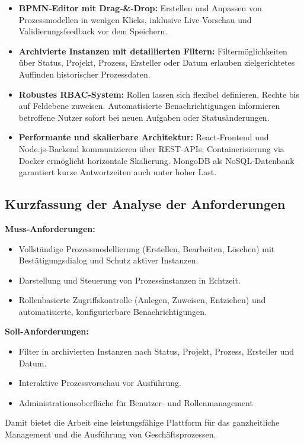 \begin{itemize}
  \item \textbf{BPMN‑Editor mit Drag‑\&‑Drop:} Erstellen und Anpassen von Prozessmodellen in wenigen Klicks, inklusive Live‑Vorschau und Validierungsfeedback vor dem Speichern.
  \item \textbf{Archivierte Instanzen mit detaillierten Filtern:} Filtermöglichkeiten über Status, Projekt, Prozess, Ersteller oder Datum erlauben zielgerichtetes Auffinden historischer Prozessdaten.
  \item \textbf{Robustes RBAC‑System:} Rollen lassen sich flexibel definieren, Rechte bis auf Feldebene zuweisen. Automatisierte Benachrichtigungen informieren betroffene Nutzer sofort bei neuen Aufgaben oder Statusänderungen.
  \item \textbf{Performante und skalierbare Architektur:} React‑Frontend und Node.js‑Backend kommunizieren über REST‑APIs; Containerisierung via Docker ermöglicht horizontale Skalierung. MongoDB als NoSQL‑Datenbank garantiert kurze Antwortzeiten auch unter hoher Last.
\end{itemize}

\newpage
\subsection*{Kurzfassung der Analyse der Anforderungen}
\textbf{Muss‑Anforderungen:}
\begin{itemize}
  \item Vollständige Prozessmodellierung (Erstellen, Bearbeiten, Löschen) mit Bestätigungsdialog und Schutz aktiver Instanzen.
  \item Darstellung und Steuerung von Prozessinstanzen in Echtzeit.
  \item Rollenbasierte Zugriffskontrolle (Anlegen, Zuweisen, Entziehen) und automatisierte, konfigurierbare Benachrichtigungen.
\end{itemize}

\textbf{Soll‑Anforderungen:}
\begin{itemize}
  \item Filter in archivierten Instanzen nach Status, Projekt, Prozess, Ersteller und Datum.
  \item Interaktive Prozessvorschau vor Ausführung.
  \item Administrationsoberfläche für Benutzer‑ und Rollenmanagement
\end{itemize}

Damit bietet die Arbeit eine leistungsfähige Plattform für das ganzheitliche Management und die Ausführung von Geschäftsprozessen.



